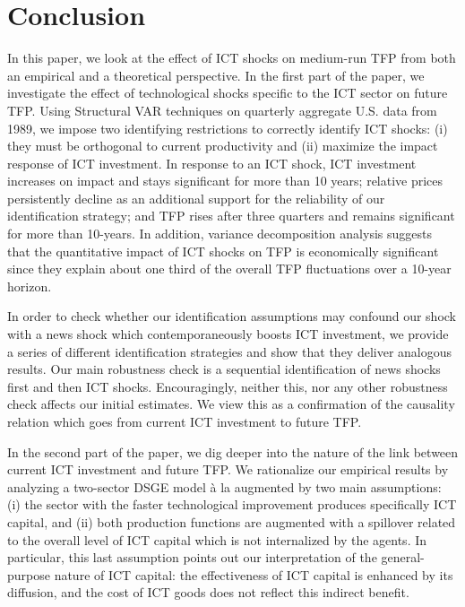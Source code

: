 \documentclass[12pt]{article}
\begin{document}



\section{Conclusion}\label{section:conclusions}


In this paper, we look at the effect of ICT shocks on medium-run TFP from both an empirical and a theoretical perspective. In the first part of the paper, we investigate the effect of technological shocks specific to the ICT sector on future TFP. Using Structural VAR techniques on quarterly aggregate U.S. data from 1989, we impose two identifying restrictions to correctly identify ICT shocks: (i) they must be orthogonal to current productivity and (ii) maximize the impact response of ICT investment. In response to an ICT shock, ICT investment increases on impact and stays significant for more than 10 years; relative prices persistently decline as an additional support for the reliability of our identification strategy; and TFP rises after three quarters and remains significant for more than 10-years. In addition, variance decomposition analysis suggests that the quantitative impact of ICT shocks on TFP is economically significant since they explain about one third of the overall TFP fluctuations over a 10-year horizon. 

In order to check whether our identification assumptions may confound our shock with a news shock which contemporaneously boosts ICT investment, we provide a series of different identification strategies and show that they deliver analogous results. Our main robustness check is a sequential identification of news shocks first and then ICT shocks. Encouragingly, neither this, nor any other robustness check affects our initial estimates. We view this as a confirmation of the causality relation which goes from current ICT investment to future TFP. 

In the second part of the paper, we dig deeper into the nature of the link between current ICT investment and future TFP. We rationalize our empirical results by analyzing a two-sector DSGE model \`a la \cite{greenwood1997long} augmented by two main assumptions: (i) the sector with the faster technological improvement produces specifically ICT capital, and (ii) both production functions are augmented with a spillover related to the overall level of ICT capital which is not internalized by the agents. In particular, this last assumption points out our interpretation of the general-purpose nature of ICT capital: the effectiveness of ICT capital is enhanced by its diffusion, and the cost of ICT goods does not reflect this indirect benefit. 
\end{document}
